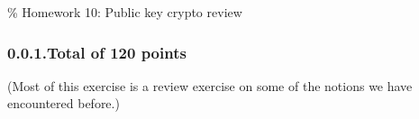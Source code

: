 \documentclass{article}
\begin{document}
\noindent{}\% Homework 10: Public key crypto review%

\newcommand{\zo}{\{0,1\}}
\newcommand{\E}{\mathbb{E}}
\newcommand{\Z}{\mathbb{Z}}
\newcommand{\getsr}{\leftarrow_R\;}
\newcommand{\Gp}{\mathbb{G}}
\newcommand{\iprod}[1]{\langle #1 \rangle}
\newcommand{\Epubcca}{E^{pub,cca}}
\newcommand{\Epubcpa}{E^{pub,cpa}}
\newcommand{\Epriv}{E^{priv,cca}}
\newcommand{\Sign}{S}
\newcommand{\Ver}{V}

\newcommand{\floor}[1]{\lfloor #1 \rfloor}
\newcommand{\ceil}[1]{\lceil #1 \rceil}

\newcommand{\cF}{\mathcal{F}}

\newcommand{\onand}{\overline{\wedge}}
\subsubsection{0.0.1.\hspace*{0.5em}Total of 120 points}\label{sec-total-of-120-points}%

\noindent{}(Most of this exercise is a review exercise on some of the notions we have encountered before.)%
\end{document}
